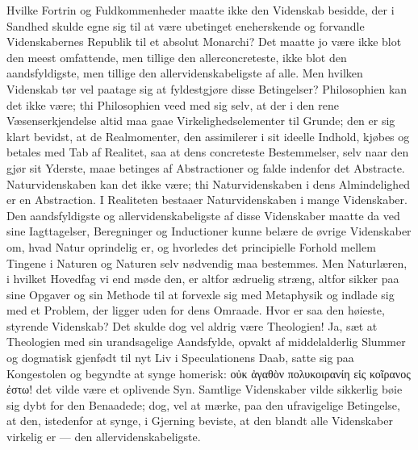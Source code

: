 \documentclass[12pt]{book}
\newcommand{\apage}[1]{\marginnote{\footnotesize\textit{[#1]}}}
\begin{document}
Hvilke Fortrin og Fuldkommenheder maatte ikke den Videnskab besidde, der i
Sandhed skulde egne sig til at være ubetinget eneherskende og forvandle
Videnskabernes Republik til et absolut Monarchi? Det maatte jo være ikke
blot den meest omfattende, men tillige den allerconcreteste, ikke blot den
aandsfyldigste, men tillige den allervidenskabeligste af alle. Men hvilken
Videnskab tør vel paatage sig at fyldestgjøre disse Betingelser?
Philosophien kan det ikke være; thi Philosophien veed med sig selv, at der
i den rene Væsenserkjendelse altid maa gaae Virkelighedselementer til
Grunde; den er sig klart bevidst, at de Realmomenter, den assimilerer i
sit ideelle Indhold, kjøbes og betales med Tab af Realitet, saa at dens
concreteste Bestemmelser, selv naar den gjør sit Yderste, maae \apage{92} betinges af
Abstractioner og falde indenfor det Abstracte. Naturvidenskaben kan det
ikke være; thi Naturvidenskaben i dens Almindelighed er en Abstraction. I
Realiteten bestaaer Naturvidenskaben i mange Videnskaber. Den aandsfyldigste
og allervidenskabeligste af disse Videnskaber maatte da ved sine
Iagttagelser, Beregninger og Inductioner kunne belære de øvrige Videnskaber
om, hvad Natur oprindelig er, og hvorledes det principielle Forhold mellem
Tingene i Naturen og Naturen selv nødvendig maa bestemmes. Men Naturlæren,
i hvilket Hovedfag vi end møde den, er altfor ædruelig stræng, altfor
sikker paa sine Opgaver og sin Methode til at forvexle sig med Metaphysik
og indlade sig med et Problem, der ligger uden for dens Omraade. Hvor er
saa den høieste, styrende Videnskab? Det skulde dog vel aldrig være
Theologien! Ja, sæt at Theologien med sin urandsagelige Aandsfylde, opvakt
af middelalderlig Slummer og dogmatisk gjenfødt til nyt Liv i Speculationens
Daab, satte sig paa Kongestolen og begyndte at synge homerisk: οὐκ ἀγαθὸν
πολυκοιρανίη εἱς κοῖρανος ἐστω! det vilde være et oplivende Syn. Samtlige
Videnskaber vilde sikkerlig bøie sig dybt for den Benaadede; dog, vel at
mærke, paa den ufravigelige Betingelse, at den, istedenfor at synge, i
Gjerning beviste, at den blandt alle Videnskaber virkelig er --- den
allervidenskabeligste.
\end{document}

